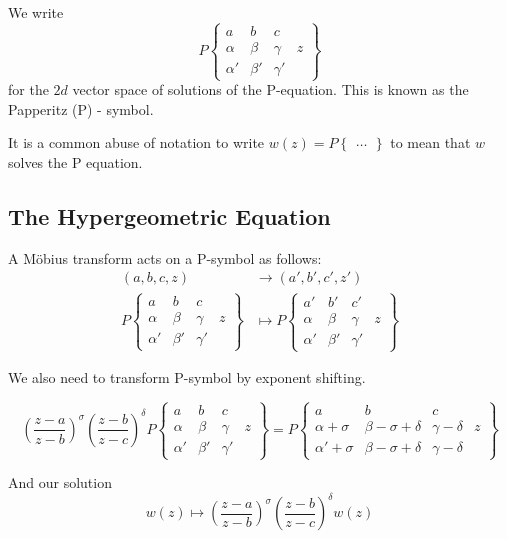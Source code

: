 \documentclass[a4paper]{article}
\begin{document}
	We write
	\[
		P \begin{Bmatrix} a & b & c & \\
				\alpha & \beta & \gamma & z \\
				\alpha' & \beta' & \gamma' &
		\end{Bmatrix} 
	\] for the $2d$ vector space of solutions of the P-equation. This is known as the Papperitz (P) - symbol.

	It is a common abuse of notation to write $w(z) = P \begin{Bmatrix} \ldots \end{Bmatrix} $ to mean that $w$ solves the P equation.

\subsection{The Hypergeometric Equation}

A M\"{o}bius transform acts on a P-symbol as follows: 
 \begin{align*}
	 (a,b,c,z) &\to (a', b', c', z') \\
	 P \begin{Bmatrix} a & b & c & \\
                                \alpha & \beta & \gamma & z \\
				\alpha' & \beta' & \gamma' &
			\end{Bmatrix} & \mapsto P \begin{Bmatrix} a' & b' & c' & \\
                                \alpha & \beta & \gamma & z \\
				\alpha' & \beta' & \gamma' &
			\end{Bmatrix}
\end{align*}

We also need to transform P-symbol by exponent shifting.

\begin{prop}
	\[
		\left( \frac{z-a}{z-b} \right)^{\sigma} \left( \frac{z-b}{z-c} \right)^{\delta} P \begin{Bmatrix} a & b & c & \\
                                \alpha & \beta & \gamma & z \\
				\alpha' & \beta' & \gamma' &
			\end{Bmatrix}
			= P \begin{Bmatrix} a & b & c & \\
                                \alpha + \sigma & \beta - \sigma + \delta & \gamma - \delta& z \\
				\alpha' + \sigma & \beta - \sigma + \delta & \gamma - \delta &
			\end{Bmatrix}
	\] 

	And our solution 
	\[
		w(z) \mapsto \left(\frac{z-a}{z-b}\right)^{\sigma} \left( \frac{z-b}{z-c} \right) ^{\delta} w(z)
	\]

\end{prop}
\end{document}
